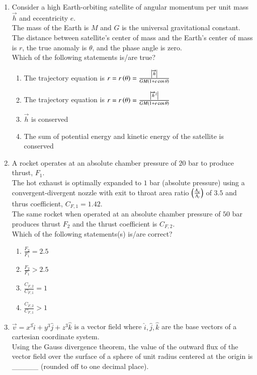\documentclass[journal]{IEEEtran}
\begin{document}
\begin{enumerate}
    \item Consider a high Earth-orbiting satellite of angular momentum per unit mass $\overrightarrow{h}$ and eccentricity $e$.\\The mass of the Earth is $M$ and $G$ is the universal gravitational constant.\\The distance between satellite's center of mass and the Earth's center of mass is $r$, the true anomaly is $\theta$, and the phase angle is zero.\\Which of the following statements is/are true?
        \begin{enumerate}
            \item The trajectory equation is $r = r\left(\theta\right) = \frac{\left\vert\overrightarrow{h}\right\vert}{GM \left(1+ e \cos \theta\right)}$
            \item The trajectory equation is $r = r\left(\theta\right) = \frac{\left\vert\overrightarrow{h}^2\right\vert}{GM \left(1+ e \cos \theta\right)}$
            \item $\overrightarrow{h}$ is conserved
            \item The sum of potential energy and kinetic energy of the satellite is conserved
        \end{enumerate}

        \item A rocket operates at an absolute chamber pressure of $20$ bar to produce thrust, $F_1$.\\The hot exhaust is optimally expanded to $1$ bar (absolute pressure) using a convergent-divergent nozzle with exit to throat area ratio $\left(\frac{A_e}{A_t}\right)$ of $3.5$ and thrus coefficient, $C_{F,1}=1.42$.\\The same rocket when operated at an absolute chamber pressure of $50$ bar produces thrust $F_2$ and the thrust coefficient is $C_{F,2}$.\\Which of the following statements(s) is/are correct?
            \begin{enumerate}
                \item $\frac{F_2}{F_1} = 2.5$
                \item $\frac{F_2}{F_1} > 2.5$
                \item $\frac{C_{F,2}}{C_{F,1}} = 1$
                \item $\frac{C_{F,2}}{C_{F,1}} > 1$
            \end{enumerate}

        \item $\overrightarrow{v} = x^3 \hat{i} + y^3 \hat{j} + z^3 \hat{k}$ is a vector field where $\hat{i},\hat{j},\hat{k}$ are the base vectors of a cartesian coordinate system.\\Using the Gauss divergence theorem, the value of the outward flux of the vector field over the surface of a sphere of unit radius centered at the origin is \_\_\_\_\_ (rounded off to one decimal place).


\end{enumerate}
\end{document}
